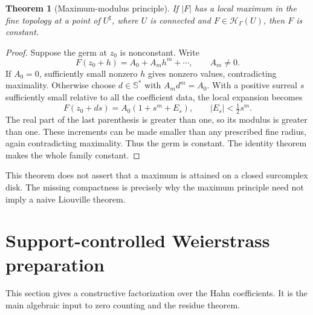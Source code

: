 \documentclass[11pt,a4paper]{article}
\newtheorem{theorem}{Theorem}[section]
\theoremstyle{definition}
\theoremstyle{remark}
\newcommand{\SC}{\mathbb S}
\newcommand{\HH}{\mathcal H}
\begin{document}
\begin{theorem}[Maximum-modulus principle]\label{thm:maxmod}
If $|F|$ has a local maximum in the fine topology at a point of
$U^\sharp$, where $U$ is connected and $F\in\HH_\Gamma(U)$,
then $F$ is constant.
\end{theorem}
\begin{proof}
Suppose the germ at $z_0$ is nonconstant. Write
\[
 F(z_0+h)=A_0+A_mh^m+\cdots,\qquad A_m\ne0.
\]
If $A_0=0$, sufficiently small nonzero $h$ gives nonzero values,
contradicting maximality. Otherwise choose $d\in\SC^*$ with
$A_md^m=A_0$. With a positive surreal $s$ sufficiently small relative
to all the coefficient data, the local expansion becomes
\[
 F(z_0+ds)=A_0(1+s^m+E_s),\qquad |E_s|<\tfrac12s^m.
\]
The real part of the last parenthesis is greater than one, so its
modulus is greater than one. These increments can be made smaller
than any prescribed fine radius, again contradicting maximality.
Thus the germ is constant. The identity theorem makes the whole
family constant.
\end{proof}
This theorem does not assert that a maximum is attained on a closed
surcomplex disk. The missing compactness is precisely why the
maximum principle need not imply a naive Liouville theorem.

\section{Support-controlled Weierstrass preparation}\label{sec:weierstrass}
This section gives a constructive factorization over the Hahn
coefficients. It is the main algebraic input to zero counting and the
residue theorem.
\end{document}

